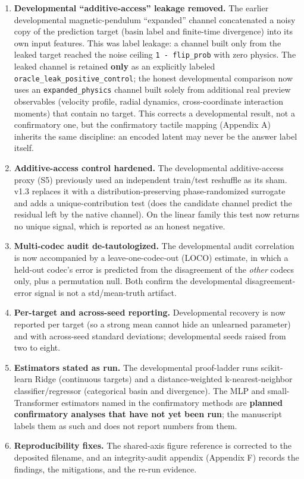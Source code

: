 \documentclass[
  11pt,
]{article}
\providecommand{\tightlist}{%
  \setlength{\itemsep}{0pt}\setlength{\parskip}{0pt}}
\begin{document}
\begin{enumerate}
\def\labelenumi{\arabic{enumi}.}
\tightlist
\item
  \textbf{Developmental ``additive-access'' leakage
  removed.} The earlier developmental magnetic-pendulum
  ``expanded'' channel concatenated a noisy copy of the
  prediction target (basin label and finite-time
  divergence) into its own input features. This was
  label leakage: a channel built only from the leaked
  target reached the noise ceiling
  \texttt{1\ -\ flip\_prob} with zero physics. The
  leaked channel is retained \textbf{only} as an
  explicitly labeled
  \texttt{oracle\_leak\_positive\_control}; the honest
  developmental comparison now uses an
  \texttt{expanded\_physics} channel built solely from
  additional real preview observables (velocity
  profile, radial dynamics, cross-coordinate
  interaction moments) that contain no target. This
  corrects a developmental result, not a confirmatory
  one, but the confirmatory tactile mapping (Appendix
  A) inherits the same discipline: an encoded latent
  may never be the answer label itself.
\item
  \textbf{Additive-access control hardened.} The
  developmental additive-access proxy (S5) previously
  used an independent train/test reshuffle as its sham.
  v1.3 replaces it with a distribution-preserving
  phase-randomized surrogate and adds a
  unique-contribution test (does the candidate channel
  predict the residual left by the native channel). On
  the linear family this test now returns no unique
  signal, which is reported as an honest negative.
\item
  \textbf{Multi-codec audit de-tautologized.} The
  developmental audit correlation is now accompanied by
  a leave-one-codec-out (LOCO) estimate, in which a
  held-out codec's error is predicted from the
  disagreement of the \emph{other} codecs only, plus a
  permutation null. Both confirm the developmental
  disagreement-error signal is not a
  std/\textbar mean-truth\textbar{} artifact.
\item
  \textbf{Per-target and across-seed reporting.}
  Developmental recovery is now reported per target (so
  a strong mean cannot hide an unlearned parameter) and
  with across-seed standard deviations; developmental
  seeds raised from two to eight.
\item
  \textbf{Estimators stated as run.} The developmental
  proof-ladder runs scikit-learn Ridge (continuous
  targets) and a distance-weighted k-nearest-neighbor
  classifier/regressor (categorical basin and
  divergence). The MLP and small-Transformer estimators
  named in the confirmatory methods are \textbf{planned
  confirmatory analyses that have not yet been run};
  the manuscript labels them as such and does not
  report numbers from them.
\item
  \textbf{Reproducibility fixes.} The shared-axis
  figure reference is corrected to the deposited
  filename, and an integrity-audit appendix (Appendix
  F) records the findings, the mitigations, and the
  re-run evidence.
\end{enumerate}
\end{document}
